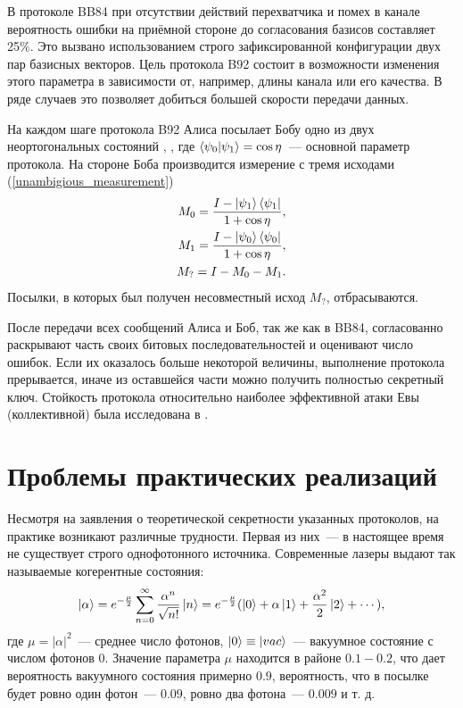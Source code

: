 В протоколе BB84 при отсутствии действий перехватчика и помех в канале вероятность ошибки на приёмной стороне до согласования базисов составляет 25\%. Это вызвано использованием строго зафиксированной конфигурации двух пар базисных векторов. Цель протокола B92 \cite{non_orthogonal_states_discrimination_theorem} состоит в возможности изменения этого параметра в зависимости от, например, длины канала или его качества. В ряде случаев это позволяет добиться большей скорости передачи данных.

На каждом шаге протокола B92 Алиса посылает Бобу одно из двух неортогональных состояний , , где $\left\langle \psi_0|\psi_1\right\rangle = \cos \eta$~--- основной параметр протокола. На стороне Боба производится измерение с тремя исходами (\ref{unambigious_measurement})
\begin{eqnarray}
  M_0 = \frac{I - \left| \psi_1 \right\rangle\left\langle \psi_1 \right|}{1 + \cos \eta}, \nonumber\\
  M_1 = \frac{I - \left| \psi_0 \right\rangle\left\langle \psi_0 \right|}{1 + \cos \eta}, \nonumber\\
  M_? = I - M_0 - M_1.
\end{eqnarray}
Посылки, в которых был получен несовместный исход $M_?$, отбрасываются.

После передачи всех сообщений Алиса и Боб, так же как в BB84, согласованно раскрывают часть своих битовых последовательностей и оценивают число ошибок. Если их оказалось больше некоторой величины, выполнение протокола прерывается, иначе из оставшейся части можно получить полностью секретный ключ. Стойкость протокола относительно наиболее эффективной атаки Евы (коллективной) была исследована в \cite{b92_security_proof}.

\section{Проблемы практических реализаций}
Несмотря на заявления о теоретической секретности указанных протоколов, на практике возникают различные трудности.
Первая из них~--- в настоящее время не существует строго однофотонного источника. Современные лазеры выдают так называемые когерентные состояния:
\begin{equation}
\left| \alpha \right\rangle = e^{-\frac{\mu}{2}} \sum_{n=0}^\infty \frac{\alpha^n}{\sqrt{n!}} \left| n \right\rangle = e^{-\frac{\mu}{2}}(\left| 0 \right\rangle + \alpha \left| 1 \right\rangle + \frac{\alpha^2}{2}\left| 2 \right\rangle + \cdots),   
\end{equation}
где $\mu = |\alpha|^2$~--- среднее число фотонов, $\left| 0 \right\rangle \equiv \left| vac \right\rangle$~--- вакуумное состояние с числом фотонов 0. Значение параметра $\mu$ находится в районе $0.1-0.2$, что дает вероятность вакуумного состояния примерно $0.9$, вероятность, что в посылке будет ровно один фотон~--- $0.09$, ровно два фотона~--- $0.009$ и т. д.

